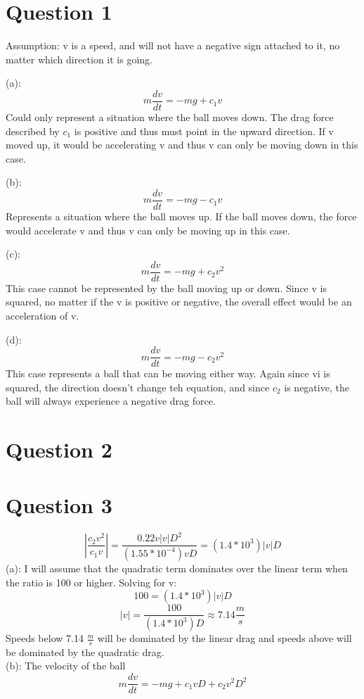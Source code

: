 \documentclass[a4paper,12pt]{article}
\begin{document}
\section*{Question 1}
Assumption: v is a speed, and will not have a negative sign attached
to it, no matter which direction it is going.

(a): \[m\frac{dv}{dt}=-mg+c_1v\] Could only represent a situation
where the ball moves down.  The drag force described by $c_1$ is
positive and thus must point in the upward direction.  If v moved up,
it would be accelerating v and thus v can only be moving down in this
case.

(b):\[m\frac{dv}{dt}=-mg-c_1v\] Represents a situation where the ball
moves up.  If the ball moves down, the force would accelerate v and
thus v can only be moving up in this case.

(c):\[m\frac{dv}{dt}=-mg+c_2v^2\] This case cannot be represented by
the ball moving up or down.  Since v is squared, no matter if the v is
positive or negative, the overall effect would be an acceleration of
v.

(d):\[m\frac{dv}{dt}=-mg-c_2v^2\] This case represents a ball that can
be moving either way.  Again since vi is squared, the direction
doesn't change teh equation, and since $c_2$ is negative, the ball
will always experience a negative drag force.

\section*{Question 2}

\section*{Question 3}
\[\left|\frac{c_2v^2}{c_1v}\right|=\frac{0.22v\left|v\right|D^2}{(1.55\ast10^{-4})vD}=(1.4\ast10^3)\left|v\right|D\](a):
I
will assume that the quadratic term dominates over the linear term
when the ratio is 100 or higher.  Solving for v:
\[100=(1.4\ast10^3)\left|v\right|D\]
\[\left|v\right|=\frac{100}{(1.4\ast10^3)D}\approx7.14\frac{m}{s}\]
Speeds below 7.14 $\frac{m}{s}$ will be dominated by the linear drag
and speeds above will be dominated by the quadratic drag.\\
(b): The velocity of the ball \[m\frac{dv}{dt}=-mg+c_1vD+c_2v^2D^2\]
\end{document}
